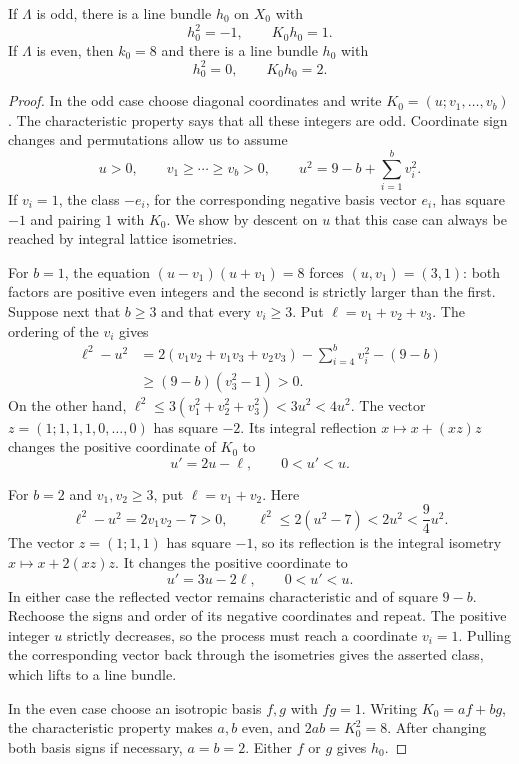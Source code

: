 \begin{lemma}\label{nr:lattice-class}
If $\Lambda$ is odd, there is a line bundle $h_0$ on $X_0$ with
\[
 h_0^2=-1,\qquad K_0h_0=1.
\]
If $\Lambda$ is even, then $k_0=8$ and there is a line bundle $h_0$ with
\[
 h_0^2=0,\qquad K_0h_0=2.
\]
\end{lemma}

\begin{proof}
In the odd case choose diagonal coordinates and write
$K_0=(u;v_1,\ldots,v_b)$.  The characteristic property says that all
these integers are odd.  Coordinate sign changes and permutations allow
us to assume
\[
 u>0,\qquad v_1\geq\cdots\geq v_b>0,
 \qquad u^2=9-b+\sum_{i=1}^b v_i^2.
\]
If $v_i=1$, the class $-e_i$, for the corresponding negative basis
vector $e_i$, has square $-1$ and pairing $1$ with $K_0$.
We show by descent on $u$ that this
case can always be reached by integral lattice isometries.

For $b=1$, the equation
$(u-v_1)(u+v_1)=8$ forces $(u,v_1)=(3,1)$: both factors are positive
even integers and the second is strictly larger than the first.
Suppose next that $b\geq3$ and that every $v_i\geq3$.  Put
$\ell=v_1+v_2+v_3$.  The ordering of the $v_i$ gives
\begin{align*}
 \ell^2-u^2
 &=2(v_1v_2+v_1v_3+v_2v_3)
       -\sum_{i=4}^b v_i^2-(9-b)\\
 &\geq (9-b)(v_3^2-1)>0.
\end{align*}
On the other hand,
$\ell^2\leq3(v_1^2+v_2^2+v_3^2)<3u^2<4u^2$.
The vector $z=(1;1,1,1,0,\ldots,0)$ has square $-2$.
Its integral reflection $x\mapsto x+(xz)z$ changes the positive
coordinate of $K_0$ to
\[
 u'=2u-\ell,\qquad 0<u'<u.
\]

For $b=2$ and $v_1,v_2\geq3$, put $\ell=v_1+v_2$.  Here
\[
 \ell^2-u^2=2v_1v_2-7>0,
 \qquad \ell^2\leq2(u^2-7)<2u^2<\frac94u^2.
\]
The vector $z=(1;1,1)$ has square $-1$, so its reflection is the
integral isometry $x\mapsto x+2(xz)z$.  It changes the positive
coordinate to
\[
 u'=3u-2\ell,\qquad 0<u'<u.
\]
In either case the reflected vector remains characteristic and of square
$9-b$.  Rechoose the signs and order of its negative coordinates and
repeat.  The positive integer $u$ strictly decreases, so the process
must reach a coordinate $v_i=1$.  Pulling the corresponding vector back
through the isometries gives the asserted class, which lifts to a line
bundle.

In the even case choose an isotropic basis $f,g$ with $fg=1$.
Writing $K_0=af+bg$, the characteristic property makes $a,b$ even,
and $2ab=K_0^2=8$.  After changing both basis signs if necessary,
$a=b=2$.  Either $f$ or $g$ gives $h_0$.
\end{proof}

